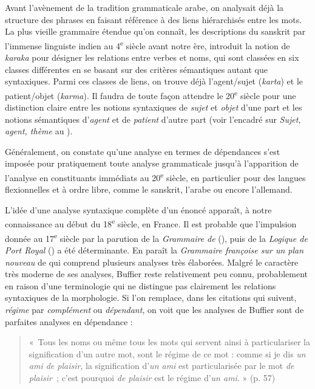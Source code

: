 {    Avant l’avènement de la tradition grammaticale arabe, on analysait déjà la structure des phrases en faisant référence à des liens hiérarchisés entre les mots. La plus vieille grammaire étendue qu’on connaît, les descriptions du sanskrit par l’immense linguiste indien  au 4\textsuperscript{e} siècle avant notre ère, introduit la notion de \textit{karaka} pour désigner les relations entre verbes et noms, qui sont classées en six classes différentes en se basant sur des critères sémantiques autant que syntaxiques. Parmi ces classes de liens, on trouve déjà l’agent/sujet (\textit{karta}) et le patient/objet (\textit{karma}). Il faudra de toute façon attendre le 20\textsuperscript{e} siècle pour une distinction claire entre les notions syntaxiques de \textit{sujet} et \textit{objet} d’une part et les notions sémantiques d’\textit{agent} et de \textit{patient} d’autre part (voir l’encadré sur \textit{Sujet, agent, thème} au ).

    Généralement, on constate qu’une analyse en termes de dépendances s’est imposée pour pratiquement toute analyse grammaticale jusqu’à l’apparition de l'analyse en constituants immédiats au 20\textsuperscript{e} siècle, en particulier pour des langues flexionnelles et à ordre libre, comme le sanskrit, l’arabe ou encore l’allemand.

    L’idée d’une analyse syntaxique complète d’un énoncé apparaît, à notre connaissance au début du 18\textsuperscript{e} siècle, en France. Il est probable que l’impulsion donnée au 17\textsuperscript{e} siècle par la parution de la \textit{Grammaire de}  (\citealt{ArnauldLancelot1660}), puis de la \textit{Logique de Port Royal} (\citealt{ArnauldNicole1662}) a été déterminante. En \citeyear{buffier1709grammaire} paraît la \textit{Grammaire françoise sur un plan nouveau} de  qui comprend plusieurs analyses très élaborées. Malgré le caractère très moderne de ses analyses, Buffier reste relativement peu connu, probablement en raison d’une terminologie qui ne distingue pas clairement les relations syntaxiques de la morphologie. Si l’on remplace, dans les citations qui suivent, \textit{régime} par \textit{complément} ou \textit{dépendant}, on voit que les analyses de Buffier sont de parfaites analyses en dépendance :
    \begin{quote}
      «~Tous les noms ou même tous les mots qui servent ainsi à particulariser la signification d’un autre mot, sont le régime de ce mot : comme si je dis \textit{un ami de plaisir}, la signification d’\textit{un ami} est particularisée par le mot \textit{de plaisir~}; c’est pourquoi \textit{de plaisir} est le régime d’\textit{un ami}. » (p. 57)
      

\end{quote}}
